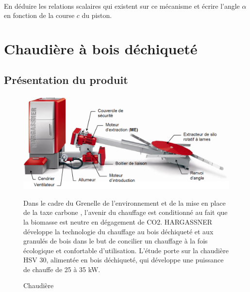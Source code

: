 ~\

En déduire les relations scalaires qui existent sur ce mécanisme et écrire l'angle $\alpha$ en fonction de la course $c$ du piston.

\newpage

\section{Chaudière à bois déchiqueté}

\subsection{Présentation du produit}

\begin{figure}[htbp]
\begin{minipage}[c]{.35\linewidth}
\begin{center}
\includegraphics[width=\linewidth]{img/Fig1.png}
\caption{Chaudière}
\label{fig:image9}
\end{center}
\end{minipage}
\hfill
\begin{minipage}[c]{.6\linewidth}
Dans le cadre du \og Grenelle de l'environnement \fg et de la mise en place de la \og taxe carbone \fg, l'avenir du chauffage est conditionné au fait que la biomasse est neutre en dégagement de CO2. HARGASSNER développe la technologie du chauffage au bois déchiqueté et aux granulés de bois dans le but de concilier un chauffage à la fois écologique et confortable d'utilisation. L'étude porte sur la chaudière HSV 30, alimentée en bois déchiqueté, qui développe une puissance de chauffe de 25 à 35 kW.
\end{minipage}
\end{figure}

